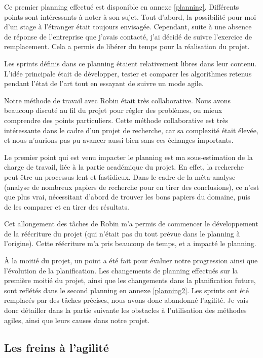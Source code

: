\documentclass[openany, 11pt]{memoir}
\begin{document}
Ce premier planning effectué est disponible en annexe \ref{planning}. Différents points sont intéressants à noter à son sujet. Tout d'abord, la possibilité pour moi d'un stage à l'étranger était toujours envisagée. Cependant, suite à une absence de réponse de l'entreprise que j'avais contacté, j'ai décidé de suivre l'exercice de remplacement. Cela a permis de libérer du temps pour la réalisation du projet.

Les sprints définis dans ce planning étaient relativement libres dans leur contenu. L'idée principale était de développer, tester et comparer les algorithmes retenus pendant l'état de l'art tout en essayant de suivre un mode agile.

\bigskip
Notre méthode de travail avec Robin était très collaborative. Nous avons beaucoup discuté au fil du projet pour régler des problèmes, ou mieux comprendre des points particuliers. Cette méthode collaborative est très intéressante dans le cadre d'un projet de recherche, car sa complexité était élevée, et nous n'aurions pas pu avancer aussi bien sans ces échanges importants.

\bigskip
Le premier point qui est venu impacter le planning est ma sous-estimation de la charge de travail, liée à la partie académique du projet. En effet, la recherche peut être un processus lent et fastidieux. Dans le cadre de la méta-analyse (analyse de nombreux papiers de recherche pour en tirer des conclusions), ce n'est que plus vrai, nécessitant d'abord de trouver les bons papiers du domaine, puis de les comparer et en tirer des résultats.

Cet allongement des tâches de Robin m'a permis de commencer le développement de la réécriture du projet (qui n'était pas du tout prévue dans le planning à l'origine). Cette réécriture m'a pris beaucoup de temps, et a impacté le planning.

\bigskip
À la moitié du projet, un point a été fait pour évaluer notre progression ainsi que l'évolution de la planification. Les changements de planning effectués sur la première moitié du projet, ainsi que les changements dans la planification future, sont reflétés dans le second planning en annexe \ref{planning2}. Les sprints ont été remplacés par des tâches précises, nous avons donc abandonné l'agilité. Je vais donc détailler dans la partie suivante les obstacles à l'utilisation des méthodes agiles, ainsi que leurs causes dans notre projet.

\subsection{Les freins à l'agilité}
\end{document}
